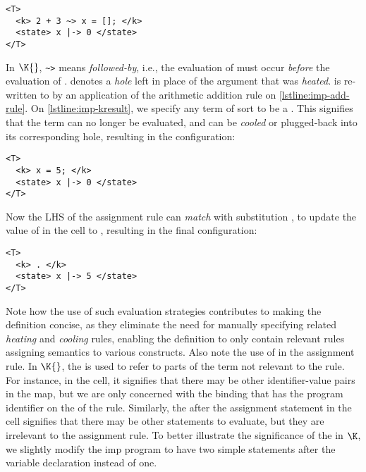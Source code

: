 \begin{lstlisting}[language=k,style=ksty,frame=single]
<T>
  <k> 2 + 3 ~> x = []; </k>
  <state> x |-> 0 </state>
</T>
\end{lstlisting}
In $\K{}$, \lstinline[style=inlineksty]{~>} means \emph{followed-by}, i.e.,
the evaluation of  must occur \emph{before} the evaluation
of . \inlinek{[]} denotes a \emph{hole} left in place of
the argument that was \emph{heated}.
is re-written to 
by an application of the arithmetic addition rule on
\autoref{lstline:imp-add-rule}. On
\autoref{lstline:imp-kresult},
we specify any term of sort  to be a .
This signifies that the term can no longer be evaluated, and can be \emph{cooled}
or plugged-back into its corresponding hole, resulting in the configuration:
\begin{lstlisting}[language=k,style=ksty,frame=single]
<T>
  <k> x = 5; </k>
  <state> x |-> 0 </state>
</T>
\end{lstlisting}
Now the LHS of the assignment rule can \emph{match} with substitution
, to
update the value of  in the  cell
to , resulting in the final configuration:
\begin{lstlisting}[language=k,style=ksty,frame=single]
<T>
  <k> . </k>
  <state> x |-> 5 </state>
</T>
\end{lstlisting}
Note how the use of such evaluation strategies contributes to making the
definition concise, as they eliminate the need for manually specifying
related \emph{heating} and \emph{cooling} rules, enabling the definition
to only contain relevant rules assigning semantics to various constructs.
Also note the use of  in the assignment rule. In $\K{}$,
the  is used to refer to parts of the term
not relevant to the rule. For instance, in the 
cell, it signifies that there may be other identifier-value
pairs in the map, but we are only concerned with the binding that has the program identifier on the \LHS{} of
the rule. Similarly, the  after the assignment statement
in the  cell signifies that there may be other statements
to evaluate, but they are irrelevant to the assignment rule.
To better illustrate the significance of the  in $\K$,
we slightly modify the imp program to have two simple statements
after the variable declaration instead of one.
